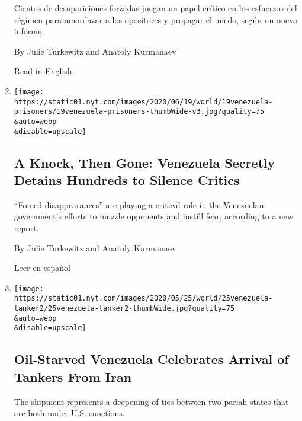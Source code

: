 \begin{enumerate}
  Cientos de desapariciones forzadas juegan un papel crítico en los
  esfuerzos del régimen para amordazar a los opositores y propagar el
  miedo, según un nuevo informe.

  By Julie Turkewitz and Anatoly Kurmanaev

  \href{https://www.nytimes.com/2020/06/19/world/americas/venezuela-forced-disappearances-Maduro.html}{Read
  in English}
\item
  \href{/2020/06/19/world/americas/venezuela-forced-disappearances-Maduro.html}{}

  \texttt{[image: https://static01.nyt.com/images/2020/06/19/world/19venezuela-prisoners/19venezuela-prisoners-thumbWide-v3.jpg?quality=75\\\&auto=webp\\\&disable=upscale]}

  \hypertarget{a-knock-then-gone-venezuela-secretly-detains-hundreds-to-silence-critics}{%
  \subsection{A Knock, Then Gone: Venezuela Secretly Detains Hundreds to
  Silence
  Critics}\label{a-knock-then-gone-venezuela-secretly-detains-hundreds-to-silence-critics}}

  ``Forced disappearances'' are playing a critical role in the
  Venezuelan government's efforts to muzzle opponents and instill fear,
  according to a new report.

  By Julie Turkewitz and Anatoly Kurmanaev

  \href{https://www.nytimes.com/es/2020/06/19/espanol/america-latina/desapariciones-forzadas-venezuela-informe-maduro.html}{Leer
  en español}
\item
  \href{/2020/05/25/world/americas/Iranian-oil-tankers-venezuela.html}{}

  \texttt{[image: https://static01.nyt.com/images/2020/05/25/world/25venezuela-tanker2/25venezuela-tanker2-thumbWide.jpg?quality=75\\\&auto=webp\\\&disable=upscale]}

  \hypertarget{oil-starved-venezuela-celebrates-arrival-of-tankers-from-iran}{%
  \subsection{Oil-Starved Venezuela Celebrates Arrival of Tankers From
  Iran}\label{oil-starved-venezuela-celebrates-arrival-of-tankers-from-iran}}

  The shipment represents a deepening of ties between two pariah states
  that are both under U.S. sanctions.


\end{enumerate}
